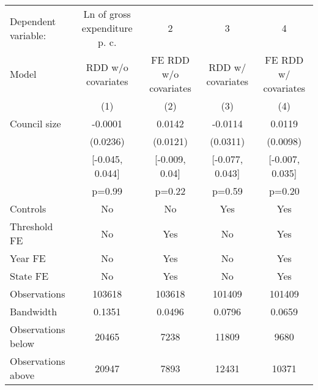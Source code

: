 \begin{tabular}{lcccc}
  \toprule
 \midrule
Dependent variable: & Ln of gross expenditure p. c. & 2 & 3 & 4 \\ 
 Model & RDD w/o covariates & FE RDD w/o covariates & RDD w/ covariates & FE RDD w/ covariates \\ 
   & (1) & (2) & (3) & (4) \\ 
   \midrule
Council size & -0.0001 & 0.0142 & -0.0114 & 0.0119 \\ 
   & (0.0236) & (0.0121) & (0.0311) & (0.0098) \\ 
   & [-0.045, 0.044] & [-0.009, 0.04] & [-0.077, 0.043] & [-0.007, 0.035] \\ 
   & p=0.99 & p=0.22 & p=0.59 & p=0.20 \\ 
   \midrule
Controls & No & No & Yes & Yes \\ 
  Threshold FE & No & Yes & No & Yes \\ 
  Year FE & No & Yes & No & Yes \\ 
  State FE & No & Yes & No & Yes \\ 
   \midrule
Observations & 103618 & 103618 & 101409 & 101409 \\ 
  Bandwidth & 0.1351 & 0.0496 & 0.0796 & 0.0659 \\ 
  Observations below & 20465 & 7238 & 11809 & 9680 \\ 
  Observations above & 20947 & 7893 & 12431 & 10371 \\ 
   \midrule
 \bottomrule
\end{tabular}
